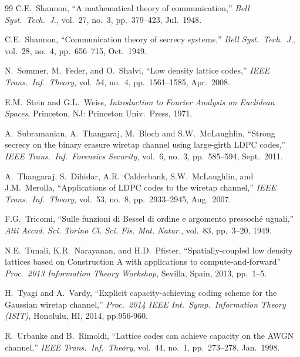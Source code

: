 \documentclass[main.tex]{subfiles}
\begin{document}
\begin{thebibliography}{99}
C.E.~Shannon, ``A mathematical theory of communication,'' \emph{Bell Syst.\ Tech.\ J.,} vol.\ 27, no.\ 3, pp.\ 379--423, Jul.\ 1948.

C.E.~Shannon, ``Communication theory of secrecy systems,'' \emph{Bell Syst.\ Tech.\ J.,} vol.\ 28, no.\ 4,  pp.\ 656--715, Oct.\ 1949.

N.~Sommer, M.~Feder, and O.~Shalvi, ``Low density lattice codes,'' \emph{IEEE Trans.\ Inf.\ Theory}, vol.\ 54, no.\ 4, pp.\ 1561--1585, Apr.\ 2008. 


 E.M.\ Stein and G.L.\ Weiss, 
\emph{Introduction to Fourier Analysis on Euclidean Spaces}, Princeton, NJ:
Princeton Univ.\ Press, 1971.

A.\ Subramanian, A.\ Thangaraj, M.\ Bloch and S.W.\ McLaughlin, ``Strong secrecy on the binary erasure wiretap channel using large-girth LDPC codes,'' 
\emph{IEEE Trans.\ Inf.\ Forensics Security,} vol.\ 6, no.\ 3, pp.\ 585--594, Sept.\ 2011.

A.\ Thangaraj, S.\ Dihidar, A.R.\ Calderbank, S.W.\ McLaughlin, and J.M.\ Merolla, ``Applications of LDPC codes to the wiretap channel,'' 
\emph{IEEE Trans.\ Inf.\ Theory,} vol.\ 53, no.\ 8, pp.\ 2933--2945, Aug.\ 2007.

 F.G.\ Tricomi, ``Sulle funzioni di Bessel di ordine
   e argomento pressoch\'{e} uguali,'' \emph{Atti Accad. Sci. Torino
     Cl. Sci. Fis. Mat. Natur.}, vol.\ 83, pp.\ 3--20, 1949.
     
  N.E.\ Tunali, K.R.\ Narayanan, and H.D.\ Pfister,
  ``Spatially-coupled low density lattices based on Construction A with applications to compute-and-forward'' \emph{Proc.\ 2013 Information Theory Workshop}, Sevilla, Spain, 2013, pp.\ 1--5.
 
 
H.\ Tyagi and A.\ Vardy, ``Explicit capacity-achieving coding scheme for the Gaussian wiretap channel,'' \emph{Proc.\ 2014 IEEE Int.\ Symp.\ Information Theory (ISIT),} Honolulu, HI, 2014, pp.956-960.

R.~Urbanke and B.~Rimoldi, ``Lattice codes can achieve capacity on
the AWGN channel,'' \emph{IEEE Trans.\ Inf.\ Theory},
vol.\ 44, no.\ 1, pp.\ 273--278, Jan.\ 1998.


\end{thebibliography}
\end{document}
